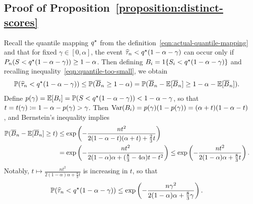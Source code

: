 \documentclass{article}
\newcommand{\scorerv}{S}
\begin{document}
\subsection{Proof of Proposition~\ref{proposition:distinct-scores}}
\label{sec:proof-distinct-scores}


Recall the quantile mapping $q^\star$ from
the definition~\eqref{eqn:actual-quantile-mapping} and that
for fixed $\gamma \in [0, \alpha]$, the event
$\widehat{\tau}_n < q^\star(1 - \alpha - \gamma)$
can occur only if
$P_n(\scorerv < q\opt(1 - \alpha - \gamma)) \ge 1 - \alpha$.
%
Then defining $B_i = \indic{\scorerv_i < q\opt(1 - \alpha - \gamma)}$
and recalling inequality~\eqref{eqn:quantile-too-small},
we obtain
\begin{align*}
  \mathbb{P}(\widehat{\tau}_n < q^\star(1 - \alpha - \gamma))
  \le \mathbb{P}(\overline{B}_n \ge 1 - \alpha)
  = \mathbb{P}(\overline{B}_n - \mathbb{E}[\overline{B}_n] \ge 1 - \alpha - \mathbb{E}[\overline{B}_n]).
\end{align*}
Define $p(\gamma) = \E[B_i]
= \P(\scorerv < q\opt(1 - \alpha - \gamma)) < 1 - \alpha - \gamma$,
so that $t = t(\gamma) \coloneqq 1 - \alpha - p(\gamma) > \gamma$.
%
Then ${\rm Var}(B_i) = p(\gamma)(1 - p(\gamma))
= (\alpha + t)(1 - \alpha - t)$, and Bernstein's inequality
implies
\begin{align*}
  \mathbb{P}(\overline{B}_n - \mathbb{E}[\overline{B}_n] \ge t)
  & \le \exp\left(-\frac{n t^2}{2 (1 - \alpha - t) (\alpha + t)
    + \frac{2}{3} t}\right) \\
  & = \exp\left(-\frac{n t^2}{2 (1 - \alpha) \alpha +
    (\frac{8}{3} - 4 \alpha) t - t^2}\right)
  \le \exp\left(-\frac{n t^2}{2(1 - \alpha) \alpha
    + \frac{8}{3} t}\right).
\end{align*}
Notably, $t \mapsto \frac{nt^2}{2(1 - \alpha) \alpha + \frac{8}{3} t}$
is increasing in $t$, so that
\begin{equation*}
  \mathbb{P}(\widehat{\tau}_n < q^\star(1 - \alpha - \gamma))
  \le \exp\left(-\frac{n \gamma^2}{2(1 - \alpha) \alpha + \frac{8}{3} \gamma}
  \right).
\end{equation*}
\end{document}
